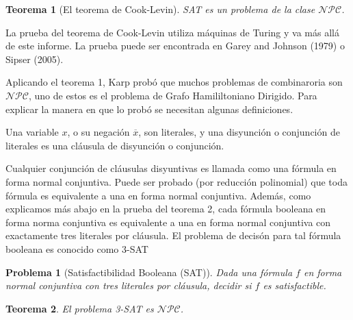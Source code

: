 \documentclass{article}
\newtheorem{theorem}{Teorema}
\newtheorem{problem}{Problema}
\begin{document}
\begin{theorem}[El teorema de Cook-Levin]
SAT es un problema de la clase $\mathcal{NPC}$.
\end{theorem}
La prueba del teorema de Cook-Levin utiliza máquinas de Turing
y va más allá de este informe. La prueba puede ser encontrada
en Garey and Johnson (1979) o Sipser (2005).

Aplicando el teorema 1, Karp probó que muchos problemas de
combinaroria son $\mathcal{NPC}$, uno de estos es el problema
de Grafo Hamililtoniano Dirigido. Para explicar la manera
en que lo probó se necesitan algunas definiciones.

Una variable $x$, o su negación $\overline{x}$, son literales,
y una disyunción o conjunción de literales es una cláusula
de disyunción o conjunción.

Cualquier conjunción de cláusulas disyuntivas es llamada como
una fórmula en forma normal conjuntiva. Puede ser probado 
(por reducción polinomial) que toda fórmula es equivalente
a una en forma normal conjuntiva. Además, como explicamos más
abajo en la prueba del teorema 2, cada fórmula booleana en 
forma norma conjuntiva es equivalente a una en forma normal
conjuntiva con exactamente tres literales por cláusula. El
problema de decisón para tal fórmula booleana es conocido como
3-SAT

\begin{problem}[Satisfactibilidad Booleana (SAT)]
Dada una fórmula $f$ en forma normal conjuntiva con tres
literales por cláusula, decidir si $f$ es satisfactible.
\end{problem}

\begin{theorem}
El problema 3-SAT es $\mathcal{NPC}$.
\end{theorem}
\end{document}
